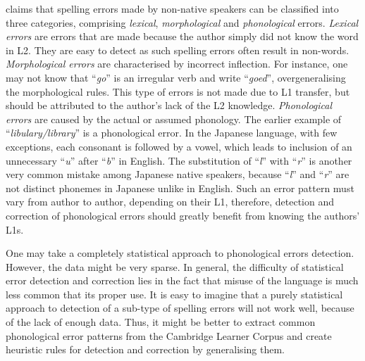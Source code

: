 \documentclass[11pt]{article}
\begin{document}
\cite{rimrott2008evaluating} claims that spelling errors made by non-native 
speakers can be classified into three categories, comprising {\em lexical}, 
{\em morphological} and {\em phonological} errors. {\em Lexical errors} are errors that are made 
because the author simply did not know the word in L2. They are easy to 
detect as such spelling errors often result in non-words. {\em Morphological errors} 
are characterised by incorrect inflection. For instance, one may not know that 
``{\em go}'' is an irregular verb and write ``{\em goed}'', overgeneralising the 
morphological rules. This type of errors is not made due to L1 transfer, but 
should be attributed to the author's lack of the L2 knowledge. {\em Phonological errors}
are caused by the actual or assumed phonology. The earlier example of 
``{\em *libulary/library}'' is a phonological error. In the Japanese language, with 
few exceptions, each consonant is followed by a vowel, which leads to inclusion of an 
unnecessary ``{\em u}'' after ``{\em b}'' in English.  The substitution of ``{\em l}'' with ``{\em r}'' is another 
very common mistake among Japanese native speakers, because ``{\em l}'' and ``{\em r}'' are 
not distinct phonemes in Japanese unlike in English. Such an error pattern must 
vary from author to author, depending on their L1, therefore, detection and 
correction of phonological errors should greatly benefit from knowing the 
authors' L1s.

One may take a completely statistical approach to phonological errors detection. 
However, the data might be very sparse. In general, the difficulty of 
statistical error detection and correction lies in the fact that misuse of the 
language is much less common that its proper use. It is easy to imagine that a 
purely statistical approach to detection of a sub-type of spelling errors will not 
work well, because of the lack of enough data. Thus, it might be better to 
extract common phonological error patterns from the Cambridge Learner Corpus and 
create heuristic rules for detection and correction by generalising them.
\end{document}
